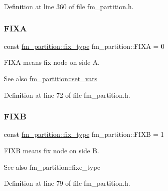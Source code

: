 Definition at line 360 of file fm\+\_\+partition.\+h.

\mbox{\label{classfm__partition_a468a80e072d3ff18e5da33005825bcb1}} 
\subsubsection{\texorpdfstring{F\+I\+XA}{FIXA}}
{\footnotesize\ttfamily const \mbox{\hyperlink{classfm__partition_a63693cd93d587dca3d1842f831cd1c55}{fm\+\_\+partition\+::fix\+\_\+type}} fm\+\_\+partition\+::\+F\+I\+XA = 0\hspace{0.3cm}{\ttfamily [static]}}

{\ttfamily F\+I\+XA} means fix node on side {\ttfamily A}.

\begin{DoxySeeAlso}{See also}
\mbox{\hyperlink{classfm__partition_aa15471da2b6a0f14060b0c4091c6b05c}{fm\+\_\+partition\+::set\+\_\+vars}} 
\end{DoxySeeAlso}


Definition at line 72 of file fm\+\_\+partition.\+h.

\mbox{\label{classfm__partition_a0b9a66f0e8093ee83482f93d6aa5b2eb}} 
\subsubsection{\texorpdfstring{F\+I\+XB}{FIXB}}
{\footnotesize\ttfamily const \mbox{\hyperlink{classfm__partition_a63693cd93d587dca3d1842f831cd1c55}{fm\+\_\+partition\+::fix\+\_\+type}} fm\+\_\+partition\+::\+F\+I\+XB = 1\hspace{0.3cm}{\ttfamily [static]}}

{\ttfamily F\+I\+XB} means fix node on side {\ttfamily B}.

\begin{DoxySeeAlso}{See also}
fm\+\_\+partition\+::fixe\+\_\+type 
\end{DoxySeeAlso}


Definition at line 79 of file fm\+\_\+partition.\+h.

\mbox{\label{classfm__partition_a3b04658dbb5b27ddd20194ff74a71082}} 
